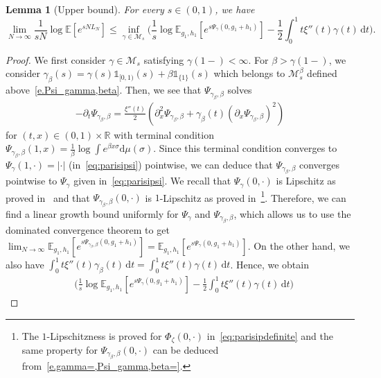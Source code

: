 \documentclass[11pt]{amsart}
\newtheorem{lemma}[proposition]{Lemma}
\theoremstyle{remark}
\theoremstyle{definition}
\numberwithin{equation}{section}
\numberwithin{proposition}{section}
\numberwithin{figure}{section}
\numberwithin{table}{section}
\newcommand{\R}{\mathbb{R}}
\newcommand{\E}{\mathbb{E}}
\renewcommand{\leq}{\leqslant}
\newcommand{\Ll}{\left}
\newcommand{\Rr}{\right}
\renewcommand{\d}{\mathrm{d}}
\newcommand{\1}{\mathbf{1}}
\newcommand{\be}{\beta}
\newcommand{\ga}{\gamma}
\newcommand{\cM}{\mathcal{M}}
\begin{document}
\begin{lemma}[Upper bound]\label{l.laplace_<}
For every $s \in (0,1)$, we have
\begin{equation}
\label{e.laplace_<}
\lim_{N\to \infty} \frac{1}{sN} \log \E \Ll[ e^{sN L_N} \Rr]   \leq  \inf_{\gamma \in \cM_{s }}\bigg( \frac 1 s \log \E_{g_1,h_1}\Ll[e^{s\Psi_{\gamma}(0,g_1+h_1)}\Rr] - \frac{1}{2} \int_0^1 t \xi''(t) \gamma(t) \, \d t \bigg).
\end{equation}
\end{lemma}

\begin{proof}
We first consider $\gamma\in\cM_s$ satisfying $\gamma(1-)<\infty$. For $\beta>\gamma(1-)$, we consider $\gamma_\beta(s) = \gamma(s)\mathds{1}_{[0,1)}(s)+ \beta \mathds{1}_{\{1\}}(s)$ which belongs to $\cM^\beta_s$ defined above~\eqref{e.Psi_gamma,beta}. Then, we see that $\Psi_{\gamma_\beta,\beta}$ solves
\begin{align*}
    -\partial_t \Psi_{\ga_\be,\be} =  \frac{\xi''(t)}{2} \Ll( \partial_{x}^2 \Psi_{\ga_\be,\be} + \ga_\be(t) ( \partial_x \Psi_{\ga_\be,\be} )^2\Rr)
\end{align*}
for $(t,x) \in (0,1) \times \R$ with terminal condition $\Psi_{\ga_\be,\be}(1,x) = \tfrac{1}{\beta}\log \int e^{\beta x\sigma}\d \mu(\sigma)$. Since this terminal condition converges to $\Psi_\gamma(1,\cdot)=|\cdot|$ (in~\eqref{eq:parisipsi}) pointwise, we can deduce that $\Psi_{\gamma_\beta,\beta}$ converges pointwise to $\Psi_\gamma$ given in~\eqref{eq:parisipsi}. We recall that $\Psi_{\gamma}(0,\cdot)$ is Lipschitz as proved in~\cite[Proposition~2~(ii)]{chen2018energy} and that $\Psi_{\gamma_\beta,\beta}(0,\cdot)$ is $1$-Lipschitz as proved in~\cite[Proposition~2]{auffinger2015properties}\footnote{The $1$-Lipschitzness is proved for $\Phi_\zeta(0,\cdot)$ in~\eqref{eq:parisipdefinite} and the same property for $\Psi_{\gamma_\beta,\beta}(0,\cdot)$ can be deduced from~\eqref{e.gamma=,Psi_gamma,beta=}.}. Therefore, we can find a linear growth bound uniformly for $\Psi_\gamma$ and $\Psi_{\gamma_\beta,\beta}$, which allows us to use the dominated convergence theorem to get $\lim_{N\to\infty}\E_{g_1,h_1}\Ll[e^{s\Psi_{\gamma_\beta,\beta}(0,g_1+h_1)}\Rr]= \E_{g_1,h_1}\Ll[e^{s\Psi_{\gamma}(0,g_1+h_1)}\Rr]$. On the other hand, we also have $\int_0^1 t \xi''(t) \gamma_\beta(t) \, \d t = \int_0^1 t \xi''(t) \gamma(t) \, \d t$. 
Hence, we obtain
\begin{align*}
    &\bigg( \frac 1 s \log \E_{g_1,h_1}\Ll[e^{s\Psi_{\gamma}(0,g_1+h_1)}\Rr] - \frac{1}{2} \int_0^1 t \xi''(t) \gamma(t) \, \d t \bigg)

\end{align*}
\end{proof}
\end{document}
